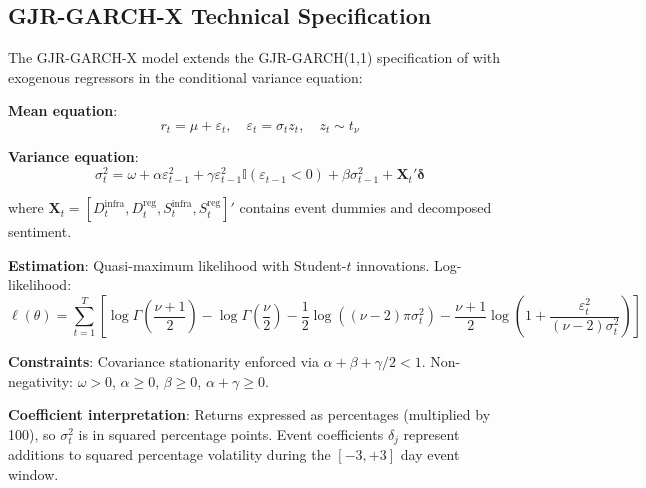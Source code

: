 \documentclass[pdflatex,sn-mathphys-num]{sn-jnl}
\theoremstyle{thmstyleone}
\theoremstyle{thmstyletwo}
\theoremstyle{thmstylethree}
\begin{document}
\begin{appendices}
\section{GJR-GARCH-X Technical Specification}\label{app:tarchx}

The GJR-GARCH-X model extends the GJR-GARCH(1,1) specification of \citet{GlostenEtAl1993} with exogenous regressors in the conditional variance equation:

\textbf{Mean equation}:
\begin{equation}
r_t = \mu + \varepsilon_t, \quad \varepsilon_t = \sigma_t z_t, \quad z_t \sim t_\nu
\end{equation}

\textbf{Variance equation}:
\begin{equation}
\sigma^2_t = \omega + \alpha \varepsilon^2_{t-1} + \gamma \varepsilon^2_{t-1} \mathbb{I}(\varepsilon_{t-1}<0) + \beta \sigma^2_{t-1} + \mathbf{X}_t' \boldsymbol{\delta}
\end{equation}

where $\mathbf{X}_t = [D^{\text{infra}}_t, D^{\text{reg}}_t, S^{\text{infra}}_t, S^{\text{reg}}_t]'$ contains event dummies and decomposed sentiment.

\textbf{Estimation}: Quasi-maximum likelihood with Student-$t$ innovations. Log-likelihood:
\begin{equation}
\ell(\theta) = \sum_{t=1}^{T} \left[ \log \Gamma\left(\frac{\nu+1}{2}\right) - \log \Gamma\left(\frac{\nu}{2}\right) - \frac{1}{2}\log((\nu-2)\pi\sigma^2_t) - \frac{\nu+1}{2}\log\left(1 + \frac{\varepsilon^2_t}{(\nu-2)\sigma^2_t}\right) \right]
\end{equation}

\textbf{Constraints}: Covariance stationarity enforced via $\alpha + \beta + \gamma/2 < 1$. Non-negativity: $\omega > 0$, $\alpha \geq 0$, $\beta \geq 0$, $\alpha + \gamma \geq 0$.

\textbf{Coefficient interpretation}: Returns expressed as percentages (multiplied by 100), so $\sigma^2_t$ is in squared percentage points. Event coefficients $\delta_j$ represent additions to squared percentage volatility during the $[-3,+3]$ day event window.

\end{appendices}



\end{document}
